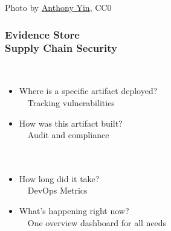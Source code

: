 \documentclass[aspectratio=169,11pt,hyperref={colorlinks=true}]{beamer}
\begin{document}
\begin{textondarkpic}{%
  Photo by \href{https://unsplash.com/@anthonyin}{\underline{Anthony Yin}}, CC0
  }%
  \frametitle{Evidence Store\\Supply Chain Security}
  ~\\
  \begin{itemize}
    \item Where is a specific artifact deployed?\\
          ~~Tracking vulnerabilities
    \item How was this artifact built?\\
          ~~Audit and compliance\\~\\~
    \item How long did it take?\\
          ~~DevOps Metrics
    \item What's happening right now?\\
          ~~One overview dashboard for all needs
  \end{itemize}
\end{textondarkpic}
\end{document}
